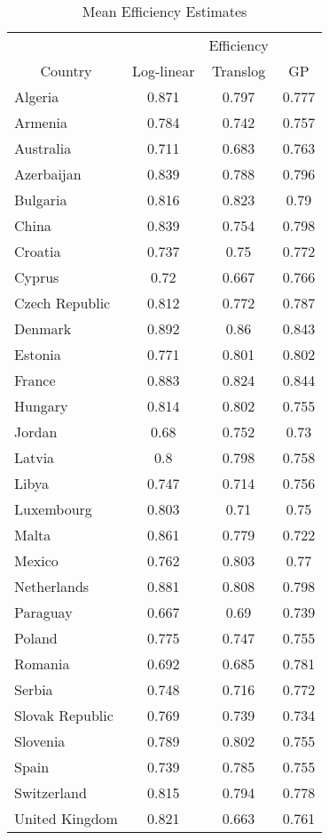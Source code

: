 \begin{table*}[!h]
\centering
\begin{tabular}{l|c|c|c}
  \multicolumn{1}{c}{} & \multicolumn{1}{c}{} & \multicolumn{1}{c}{Efficiency} & \multicolumn{1}{c}{} \\ 
   \cline{2-4}\multicolumn{1}{c}{Country} & \multicolumn{1}{c}{Log-linear} & \multicolumn{1}{c}{Translog} & \multicolumn{1}{c}{GP} \\ 
   \hline
\hline
Algeria & 0.871 & 0.797 & 0.777 \\ 
  Armenia & 0.784 & 0.742 & 0.757 \\ 
  Australia & 0.711 & 0.683 & 0.763 \\ 
  Azerbaijan & 0.839 & 0.788 & 0.796 \\ 
  Bulgaria & 0.816 & 0.823 & 0.79 \\ 
  China & 0.839 & 0.754 & 0.798 \\ 
  Croatia & 0.737 & 0.75 & 0.772 \\ 
  Cyprus & 0.72 & 0.667 & 0.766 \\ 
  Czech Republic & 0.812 & 0.772 & 0.787 \\ 
  Denmark & 0.892 & 0.86 & 0.843 \\ 
  Estonia & 0.771 & 0.801 & 0.802 \\ 
  France & 0.883 & 0.824 & 0.844 \\ 
  Hungary & 0.814 & 0.802 & 0.755 \\ 
  Jordan & 0.68 & 0.752 & 0.73 \\ 
  Latvia & 0.8 & 0.798 & 0.758 \\ 
  Libya & 0.747 & 0.714 & 0.756 \\ 
  Luxembourg & 0.803 & 0.71 & 0.75 \\ 
  Malta & 0.861 & 0.779 & 0.722 \\ 
  Mexico & 0.762 & 0.803 & 0.77 \\ 
  Netherlands & 0.881 & 0.808 & 0.798 \\ 
  Paraguay & 0.667 & 0.69 & 0.739 \\ 
  Poland & 0.775 & 0.747 & 0.755 \\ 
  Romania & 0.692 & 0.685 & 0.781 \\ 
  Serbia & 0.748 & 0.716 & 0.772 \\ 
  Slovak Republic & 0.769 & 0.739 & 0.734 \\ 
  Slovenia & 0.789 & 0.802 & 0.755 \\ 
  Spain & 0.739 & 0.785 & 0.755 \\ 
  Switzerland & 0.815 & 0.794 & 0.778 \\ 
  United Kingdom & 0.821 & 0.663 & 0.761 \\ 
   \hline
\end{tabular}
\caption{Mean Efficiency Estimates} 
\label{tab:EfficiencyEstimates}
\end{table*}
